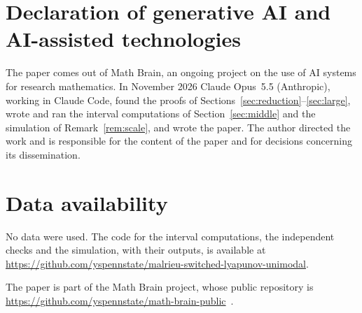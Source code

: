 \documentclass[11pt]{amsart}
\theoremstyle{remark}
\numberwithin{equation}{section}
\begin{document}
\section*{Declaration of generative AI and AI-assisted technologies}
The paper comes out of Math Brain, an ongoing project on the use of AI systems for research mathematics. In November 2026 Claude Opus~5.5 (Anthropic), working in Claude Code, found the proofs of Sections~\ref{sec:reduction}--\ref{sec:large}, wrote and ran the interval computations of Section~\ref{sec:middle} and the simulation of Remark~\ref{rem:scale}, and wrote the paper. The author directed the work and is responsible for the content of the paper and for decisions concerning its dissemination.

\section*{Data availability}
No data were used. The code for the interval computations, the independent checks and the simulation, with their outputs, is available at\\ \url{https://github.com/yspennstate/malrieu-switched-lyapunov-unimodal}.

The paper is part of the Math Brain project, whose public repository is \url{https://github.com/yspennstate/math-brain-public}~\cite{MathBrainRepo}.
\end{document}
